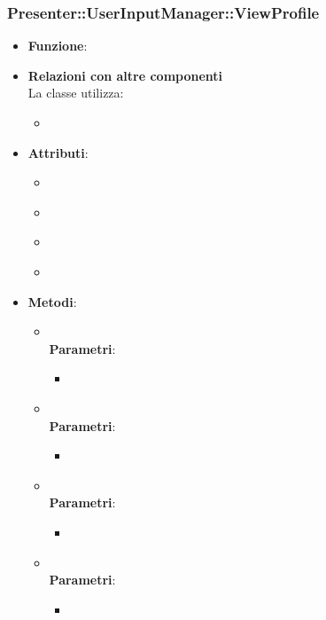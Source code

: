 \subsubsection{Presenter::UserInputManager::ViewProfile}
\begin{itemize}
\item\textbf{Funzione}:
\item\textbf{Relazioni con altre componenti}\\
La classe utilizza:
	\begin{itemize}
		\item
	\end{itemize}
\item\textbf{Attributi}:
	\begin{itemize}
		\item\code{}\\
		\item\code{}\\
		\item\code{}\\
		\item\code{}\\
	\end{itemize}
\item\textbf{Metodi}:
	\begin{itemize}
		\item\code{}\\
		\textbf{Parametri}:
			\begin{itemize}
				\item\code{}\\
			\end{itemize}
		\item\code{}\\
		\textbf{Parametri}:
			\begin{itemize}
				\item\code{}\\
			\end{itemize}
		\item\code{}\\
		\textbf{Parametri}:
			\begin{itemize}
				\item\code{}\\
			\end{itemize}
		\item\code{}\\
		\textbf{Parametri}:
			\begin{itemize}
				\item\code{}\\
			\end{itemize}
	\end{itemize}
\end{itemize}

